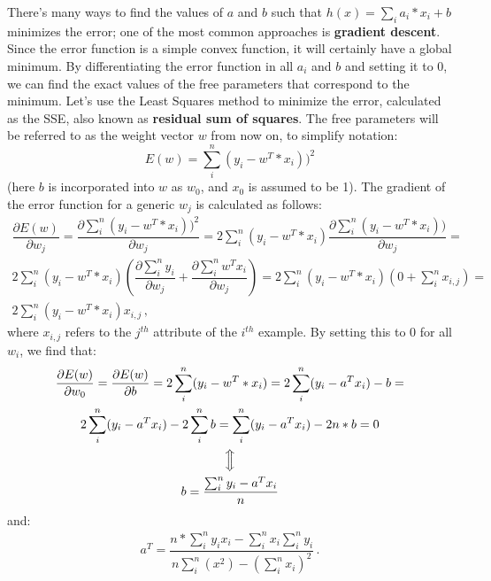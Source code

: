 There's many ways to find the values of $a$ and $b$ such that $h(x) = \sum_i a_i * x_i + b$ minimizes the error; one of the most common approaches is \textbf{gradient descent}. Since the error function is a simple convex function, it will certainly have a global minimum. By differentiating the error function in all $a_i$ and $b$ and setting it to 0, we can find the exact values of the free parameters that correspond to the minimum. Let's use the Least Squares method to minimize the error, calculated as the SSE, also known as \textbf{residual sum of squares}. The free parameters will be referred to as the weight vector $w$ from now on, to simplify notation:
\begin{equation*}
    E(w) = \sum_i^n (y_i - w^T*x_i))^2 
\end{equation*}
(here $b$ is incorporated into $w$ as $w_0$, and $x_0$ is assumed to be 1). The gradient of the error function for a generic $w_j$ is calculated as follows:
\begin{gather*}
    \dfrac{\partial E(w)}{\partial w_j} = \dfrac{\partial \sum_i^n (y_i - w^T*x_i))^2}{\partial w_j} = 2 \sum_i^n (y_i - w^T*x_i) \dfrac{\partial \sum_i^n (y_i - w^T*x_i))}{\partial w_j} = \\
    2 \sum_i^n (y_i - w^T*x_i) (\dfrac{\partial \sum_i^n y_i}{\partial w_j} +\dfrac{\partial \sum_i^n w^T x_i}{\partial w_j}) = 2 \sum_i^n (y_i - w^T*x_i) ( 0 + \sum_i^n x_{i,j}) = \\
    2 \sum_i^n (y_i - w^T*x_i) x_{i,j} \,,
\end{gather*}
where $x_{i,j}$ refers to the $j^{th}$ attribute of the $i^{th}$ example. By setting this to 0 for all $w_i$, we find that:
\begin{gather*}
    \dfrac{\partial E(w)}{\partial w_0} = \dfrac{\partial E(w)}{\partial b} = 2 \sum_i^n (y_i - w^T*x_i) = 2 \sum_i^n (y_i - a^Tx_i) - b = \\
    2 \sum_i^n (y_i - a^Tx_i) - 2\sum_i^n b = \sum_i^n (y_i - a^Tx_i) - 2n*b = 0 \\
    \Big\Updownarrow \\
    b = \dfrac{\sum_i^n y_i - a^Tx_i}{n}
\end{gather*}
and:
\begin{gather*}
    a^T = \dfrac{n * \sum_i^n y_i x_i - \sum_i^n x_i \sum_i^n y_i}{n\sum_i^n (x^2) - (\sum_i^n x_i)^2} \,.
\end{gather*}

